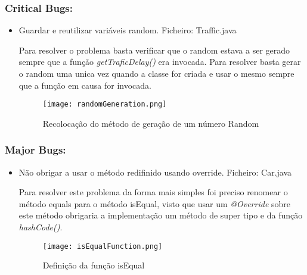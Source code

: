 \subsubsection{Critical Bugs:}
\begin{itemize}
\item Guardar e reutilizar variáveis random.\newline
 Ficheiro: Traffic.java \newline


\par Para resolver o problema basta verificar que o random estava a ser gerado sempre que a função \textit{getTraficDelay()} era invocada. Para resolver basta gerar o random uma unica vez quando a classe for criada e usar o mesmo sempre que a função em causa for invocada.

\begin{figure}[H]

  \centering

  \texttt{[image: randomGeneration.png]}

  \caption {Recolocação do método de geração de um número Random}

  \label {fig06}

\end{figure}
\end{itemize}

\subsubsection{Major Bugs:}
\begin{itemize}
\item Não obrigar a usar o método redifinido usando override.\newline
 Ficheiro: Car.java\newline

\par Para resolver este problema da forma mais simples foi preciso renomear o método equals para o método isEqual, visto que usar um \textit{@Override} sobre este método obrigaria a implementação um método de super tipo e da função \textit{hashCode()}.


\begin{figure}[H]

  \centering

  \texttt{[image: isEqualFunction.png]}

  \caption {Definição da função isEqual}

  \label {fig07}

\end{figure}

\end{itemize}

